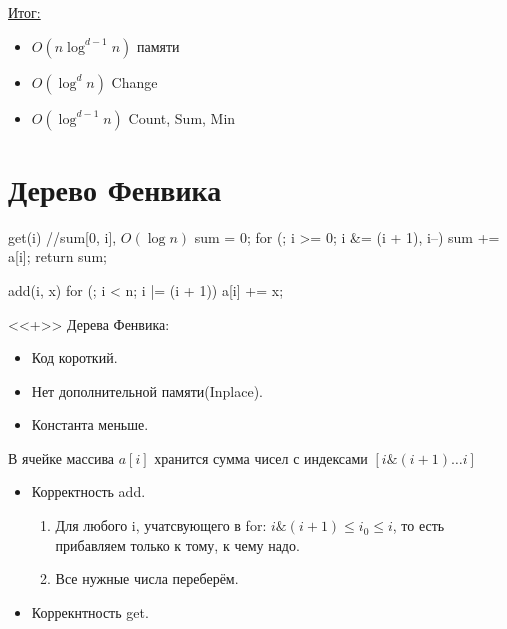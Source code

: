 \underline{Итог:}
\begin{itemize}
	\item $O(n\log^{d - 1}n)$ памяти
	\item $O(\log^d n)$ Change
	\item $O(\log^{d - 1} n)$ Count, Sum, Min   
\end{itemize}

\section{Дерево Фенвика}

\begin{cppcode}
get(i) { //sum[0, i], $O(\log n)$
		sum = 0;
		for (; i >= 0; i &= (i + 1), i--)
			sum += a[i];
    return sum;
}
\end{cppcode}

\begin{cppcode}
add(i, x){
	for (; i < n; i |= (i + 1))
		a[i] += x;
}
\end{cppcode}

<<+>> Дерева Фенвика:
\begin{itemize}
	\item Код короткий.
	\item Нет дополнительной памяти(Inplace).
	\item Константа меньше.
\end{itemize}

В ячейке массива $a[i]$ хранится сумма чисел с индексами $[i\&(i + 1) \dots i]$

\begin{center}  \end{center}

\begin{itemize}
	\item Корректность add.
		\begin{enumerate}
			\item Для любого i, учатсвующего в for: $i\&(i + 1) \le i_0 \le i$, то есть прибавляем только к тому, к чему надо.
			\item Все нужные числа переберём.
		\end{enumerate}
	\item Коррекнтность get.	
\end{itemize}

\begin{center}  \end{center}

